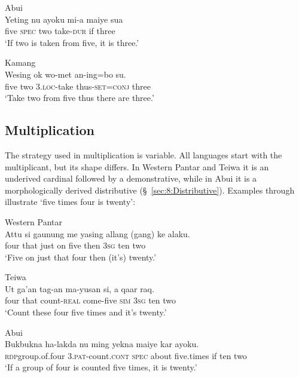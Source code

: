 \ea
\label{ex:8:1243}
{\upshape Abui}\\
 \gll Yeting  nu  ayoku  mi-a  maiye  sua\\
  five  \textsc{spec } two  take-\textsc{dur } if  three   \\
 \glt `If two is taken from five, it is three.' 
\z
 
  

\ea%
\label{bkm:Ref358115306}
  
{\upshape Kamang}\\
\gll  Wesing  ok  wo-met  an-ing=bo  su.   \\  
    five  two   3.\textsc{loc-}take  thus\textsc{{}-set}=\textsc{conj} three   \\
\glt `Take two from five thus there are three.' 
\z



 

 

\subsection{Multiplication}
\label{sec:8:Multiplication}
The strategy used in multiplication is variable. All languages start with the multiplicant, but its shape differs. In Western Pantar and Teiwa it is an underived cardinal followed by a demonstrative, while in Abui it is a morphologically derived distributive ({\S}~\ref{sec:8:Distributive}). Examples  through   illustrate `five times four is twenty':


\ea%
\label{bkm:Ref358043144}
{\upshape Western Pantar}\\
\gll Attu  si  gaunung  me  yasing   allang  (gang)  ke alaku. \\  
   four  that  just  on  five  then  3\textsc{sg } ten two   \\
\glt `Five on just that four then (it's) twenty.'
\z


\ea
\label{ex:8:1244}
{\upshape Teiwa}\\ 
 \gll   Ut  ga'an  tag-an  ma-yusan  si,  a   qaar raq.  \\
    four  that   count-\textsc{real } come-five  \textsc{sim}  \textsc{3sg} ten two  \\
 \glt `Count these four five times and it's twenty.'
\z



\ea
\label{ex:8:1245}
{\upshape Abui}\\ 
 \gll Buk{\Tilde}bukna  ha-lakda  nu  ming  yekna  maiye  kar ayoku. \\
  \textsc{rdp}{\Tilde}group.of.four  \textsc{3.pat}-count.\textsc{cont}  \textsc{spec}  about  five.times  if  ten two  \\
 \glt  `If a group of four is counted five times, it is twenty.'
\z

